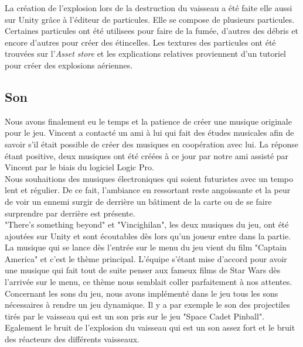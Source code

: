 \documentclass[12pt, titlepage]{article}
\begin{document}
\begin{spacing}{1.5}
La création de l’explosion lors de la destruction du vaisseau a été faite elle aussi sur Unity grâce à l’éditeur de particules. Elle se compose de plusieurs particules. Certaines particules ont été utilisees pour faire de la fumée, d'autres des débris et encore d'autres pour créer des étincelles. Les textures des particules ont été trouvées sur l’\textit{Asset store} et les explications relatives proviennent d'un tutoriel pour créer des explosions aériennes.\\


\subsection{Son}

Nous avons finalement eu le temps et la patience de créer une musique originale pour le jeu. Vincent a contacté un ami à lui qui fait des études musicales afin de savoir s'il était possible de créer des musiques en coopération avec lui. La réponse étant positive, deux musiques ont été créées à ce jour par notre ami assisté par Vincent par le biais du logiciel Logic Pro. \\
Nous souhaitions des musiques électroniques qui soient futuristes avec un tempo lent et régulier. De ce fait, l'ambiance en ressortant reste angoissante et la peur de voir un ennemi surgir de derrière un bâtiment de la carte ou de se faire surprendre par derrière est présente.\\

"There's something beyond" et "Vincighilan", les deux musiques du jeu, ont été ajoutées sur Unity et sont écoutables dès lors qu'un joueur entre dans la partie. \\

La musique qui se lance dès l’entrée sur le menu du jeu vient du film "Captain America" et c’est le thème principal. L’équipe s’étant mise d’accord pour avoir une musique qui fait tout de suite penser aux fameux films de Star Wars dès l’arrivée sur le menu, ce thème nous semblait coller parfaitement à nos attentes. \\

Concernant les sons du jeu, nous avons implémenté dans le jeu tous les sons nécessaires à rendre un jeu dynamique. Il y a par exemple le son des projectiles tirés par le vaisseau qui est un son pris sur le jeu "Space Cadet Pinball". Egalement le bruit de l’explosion du vaisseau qui est un son assez fort et le bruit des réacteurs des différents vaisseaux. \\


\end{spacing}
\end{document}
